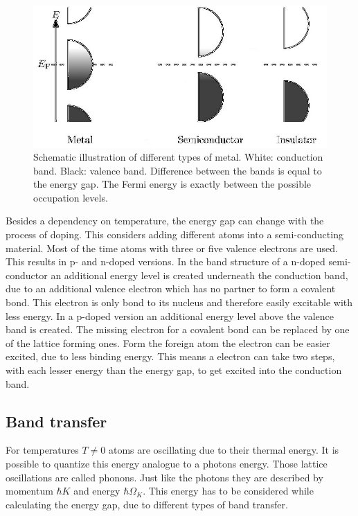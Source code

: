 \documentclass[]{article}
\begin{document}
\begin{figure}[H]
\centering
\includegraphics[width=.7\textwidth]{Plots/bandstructure.png}
\caption{Schematic illustration of different types of metal. White: conduction band. Black: valence band. Difference between the bands is equal to the energy gap. The Fermi energy is exactly between the possible occupation levels. \cite{wiki}}
\label{fig:bandstructure}
\end{figure}

Besides a dependency on temperature, the energy gap can change with the process of doping. This considers adding different atoms into a semi-conducting material. Most of the time atoms with three or five valence electrons are used. This results in p- and n-doped versions. In the band structure of a n-doped semi-conductor an additional energy level is created underneath the conduction band, due to an additional valence electron which has no partner to form a covalent bond. This electron is only bond to its nucleus and therefore easily excitable with less energy.
In a p-doped version an additional energy level above the valence band is created. The missing electron for a covalent bond can be replaced by one of the lattice forming ones. Form the foreign atom the electron can be easier excited, due to less binding energy. This means a electron can take two steps, with each lesser energy than the energy gap, to get excited into the conduction band.


\subsection{Band transfer}
For temperatures $T\neq 0$ atoms are oscillating due to their thermal energy. It is possible to quantize this energy analogue to a photons energy. Those lattice oscillations are called phonons. Just like the photons they are described by momentum $\hbar K$ and energy $\hbar \Omega_K$. This energy has to be considered while calculating the energy gap, due to different types of band transfer.
\end{document}
